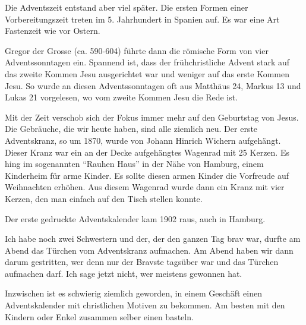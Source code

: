 \documentclass[fontsize=16pt]{mybib}
\begin{document}
Die Adventszeit entstand aber viel später. Die ersten Formen einer Vorbereitungszeit treten im 5. Jahrhundert in Spanien auf. Es war eine Art Fastenzeit wie vor Ostern.

Gregor der Grosse (ca. 590-604) führte dann die römische Form von vier Adventssonntagen ein. Spannend ist, dass der frühchristliche Advent stark auf das zweite Kommen Jesu ausgerichtet war und weniger auf das erste Kommen Jesu. So wurde an diesen Adventssonntagen oft aus Matthäus 24, Markus 13 und Lukas 21 vorgelesen, wo vom zweite Kommen Jesu die Rede ist. 

Mit der Zeit verschob sich der Fokus immer mehr auf den Geburtstag von Jesus. Die Gebräuche, die wir heute haben, sind alle ziemlich neu. Der erste Adventskranz, so um 1870, wurde von Johann Hinrich Wichern aufgehängt. Dieser Kranz war ein an der Decke aufgehängtes Wagenrad mit 25 Kerzen. Es hing im sogenannten \enquote{Rauhen Haus} in der Nähe von Hamburg, einem Kinderheim für arme Kinder. Es sollte diesen armen Kinder die Vorfreude auf Weihnachten erhöhen. Aus diesem Wagenrad wurde dann ein Kranz mit vier Kerzen, den man einfach auf den Tisch stellen konnte.

Der erste gedruckte Adventskalender kam 1902 raus, auch in Hamburg.

Ich habe noch zwei Schwestern und der, der den ganzen Tag brav war, durfte am Abend das Türchen vom Adventskranz aufmachen. Am Abend haben wir dann darum gestritten, wer denn nur der Bravste tagsüber war und das Türchen aufmachen darf. Ich sage jetzt nicht, wer meistens gewonnen hat.

Inzwischen ist es schwierig ziemlich geworden, in einem Geschäft einen Adventskalender mit christlichen Motiven zu bekommen. Am besten mit den Kindern oder Enkel zusammen selber einen basteln.
\end{document}
